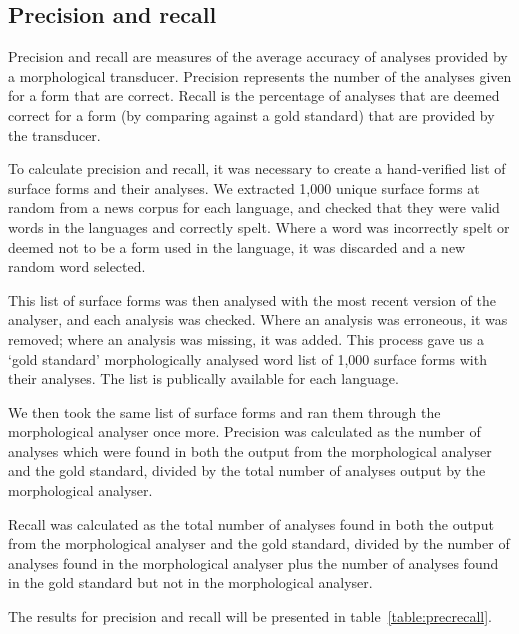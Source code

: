 \documentclass[a4paper,11pt,twocolumn]{article}
\begin{document}
\subsection{Precision and recall}

Precision and recall are measures of the average accuracy of analyses provided by a morphological transducer.  Precision represents the number of the analyses given for a form that are correct.  Recall is the percentage of analyses that are deemed correct for a form (by comparing against a gold standard) that are provided by the transducer.

To calculate precision and recall, it was necessary to create a hand-verified list of surface forms and their analyses.  We extracted 1,000 unique surface forms at random from a news corpus for each language, and checked that they were valid words in the languages and correctly spelt.  Where a word was incorrectly spelt or deemed not to be a form used in the language, it was discarded and a new random word selected.

This list of surface forms was then analysed with the most recent version of the analyser, and each analysis was checked.  Where an analysis was erroneous, it was removed; where an analysis was missing, it was added.  This process gave us a `gold standard' morphologically analysed word list of 1,000 surface forms with their analyses.  The list is publically available for each language.%

We then took the same list of surface forms and ran them through the morphological analyser once more.  Precision was calculated as the number of analyses which were found in both the output from the morphological analyser and the gold standard, divided by the total number of analyses output by the morphological analyser.

Recall was calculated as the total number of analyses found in both the output from the morphological analyser and the gold standard, divided by the number of analyses found in the morphological analyser plus the number of analyses found in the gold standard but not in the morphological analyser.

The results for precision and recall will be presented in table~\ref{table:precrecall}.

\end{document}
